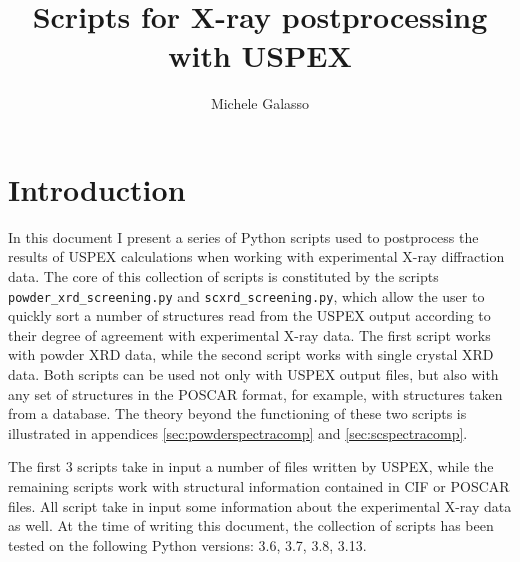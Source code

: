 \documentclass{article}
\begin{document}
\title{Scripts for X-ray postprocessing with USPEX}
\author{Michele Galasso}

\maketitle


\section{Introduction}
In this document I present a series of Python scripts used to postprocess the results of USPEX calculations when working with experimental X-ray diffraction data. The core of this collection of scripts is constituted by the scripts \texttt{powder\_xrd\_screening.py} and \texttt{scxrd\_screening.py}, which allow the user to quickly sort a number of structures read from the USPEX output according to their degree of agreement with experimental X-ray data. The first script works with powder XRD data, while the second script works with single crystal XRD data. Both scripts can be used not only with USPEX output files, but also with any set of structures in the POSCAR format, for example, with structures taken from a database. The theory beyond the functioning of these two scripts is illustrated in appendices \ref{sec:powderspectracomp} and \ref{sec:scspectracomp}.

The first 3 scripts take in input a number of files written by USPEX, while the remaining scripts work with structural information contained in CIF or POSCAR files. All script take in input some information about the experimental X-ray data as well. At the time of writing this document, the collection of scripts has been tested on the following Python versions: 3.6, 3.7, 3.8, 3.13.
\end{document}
